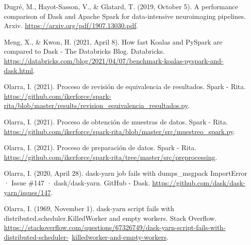 \documentclass[11pt, oneside]{book}
\begin{document}
\begin{thebibliography}{111}
 Dugré, M., Hayot-Sasson, V., \& Glatard, T. (2019, October 5). A performance comparison of Dask and Apache Spark for data-intensive neuroimaging pipelines. Arxiv. \url{https://arxiv.org/pdf/1907.13030.pdf}.

 Meng, X., \& Kwon, H. (2021, April 8). How fast Koalas and PySpark are compared to Dask - The Databricks Blog. Databricks. \url{https://databricks.com/blog/2021/04/07/benchmark-koalas-pyspark-and-dask.html}. 

 Olarra, I. (2021). Proceso de revisión de equivalencia de resultados. Spark - Rita. \url{https://github.com/ikerforce/spark-rita/blob/master/results/revision_equivalencia_resultados.py}. 

 Olarra, I. (2021). Proceso de obtención de muestras de datos. Spark - Rita. \url{https://github.com/ikerforce/spark-rita/blob/master/src/muestreo_spark.py}.

 Olarra, I. (2021). Proceso de preparación de datos. Spark - Rita. \url{https://github.com/ikerforce/spark-rita/tree/master/src/preprocessing}.

 Olarra, I. (2020, April 28). dask-yarn job fails with dumps\_msgpack ImportError · Issue \#147 · dask/dask-yarn. GitHub - Dask. \url{https://github.com/dask/dask-yarn/issues/147}. 

 Olarra, I. (1969, November 1). dask-yarn script fails with distributed.scheduler.KilledWorker and empty workers. Stack Overflow. \url{https://stackoverflow.com/questions/67326749/dask-yarn-script-fails-with-distributed-scheduler-}\ \url{killedworker-and-empty-workers}. 



























\end{thebibliography}
\end{document}
